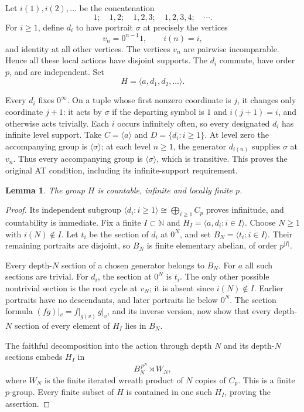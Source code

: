 \documentclass[11pt]{article}
\newtheorem{lemma}[theorem]{Lemma}
\theoremstyle{definition}
\begin{document}
Let \(i(1),i(2),\ldots\) be the concatenation
\[
 1;\quad 1,2;\quad 1,2,3;\quad 1,2,3,4;\quad\cdots.
\]
For \(i\geq1\), define \(d_i\) to have portrait \(\sigma\) at precisely
the vertices
\[
 v_n=0^{n-1}1,\qquad i(n)=i,
\]
and identity at all other vertices. The vertices \(v_n\) are pairwise
incomparable. Hence all these local actions have disjoint supports.
The \(d_i\) commute, have order \(p\), and are independent. Set
\[
 H=\langle a,d_1,d_2,\ldots\rangle.
\]

Every \(d_i\) fixes \(0^\infty\). On a tuple whose first nonzero coordinate
is \(j\), it changes only coordinate \(j+1\): it acts by \(\sigma\)
if the departing symbol is \(1\) and \(i(j+1)=i\), and otherwise acts
trivially. Each \(i\) occurs infinitely often, so every designated \(d_i\)
has infinite level support. Take \(C=\langle a\rangle\) and
\(D=\{d_i:i\geq1\}\). At level zero the accompanying group is
\(\langle\sigma\rangle\); at each level \(n\geq1\), the generator
\(d_{i(n)}\) supplies \(\sigma\) at \(v_n\). Thus every accompanying group
is \(\langle\sigma\rangle\), which is transitive. This proves the original
AT condition, including its infinite-support requirement.

\begin{lemma}\label{lem:target}
The group \(H\) is countable, infinite and locally finite \(p\).
\end{lemma}
\begin{proof}
Its independent subgroup \(\langle d_i:i\geq1\rangle\cong
\bigoplus_{i\geq1}C_p\) proves infinitude, and countability is immediate.
Fix a finite \(I\subset\mathbb N\) and
\(H_I=\langle a,d_i:i\in I\rangle\). Choose \(N\geq1\) with \(i(N)\notin I\).
Let \(t_i\) be the section of \(d_i\) at \(0^N\), and set
\(B_N=\langle t_i:i\in I\rangle\). Their remaining portraits are disjoint,
so \(B_N\) is finite elementary abelian, of order \(p^{|I|}\).

Every depth-\(N\) section of a chosen generator belongs to \(B_N\).
For \(a\) all such sections are trivial. For \(d_i\), the section at
\(0^N\) is \(t_i\). The only other possible nontrivial section is the
root cycle at \(v_N\); it is absent since \(i(N)\notin I\). Earlier
portraits have no descendants, and later portraits lie below \(0^N\).
The section formula
\((fg)|_v=f|_{g(v)}\,g|_v\), and its inverse version, now show that every
depth-\(N\) section of every element of \(H_I\) lies in \(B_N\).

The faithful decomposition into the action through depth \(N\) and its
depth-\(N\) sections embeds \(H_I\) in
\[
 B_N^{\,p^N}\rtimes W_N,
\]
where \(W_N\) is the finite iterated wreath product of \(N\) copies of
\(C_p\). This is a finite \(p\)-group. Every finite subset of \(H\)
is contained in one such \(H_I\), proving the assertion.
\end{proof}
\end{document}

